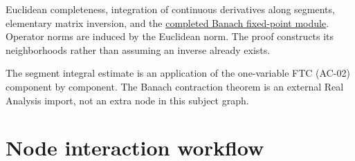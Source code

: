 \documentclass[preprint,12pt,aps,pra,showkeys,amsmath,amssymb,superscriptaddress,floatfix]{revtex4-2}
\theoremstyle{definition}
\theoremstyle{remark}
\begin{document}
Euclidean completeness, integration of continuous derivatives along
segments, elementary matrix inversion, and the
\href{../../../2-Analysis/Real-Analysis/projects/banach-fixed-point-theorem.md}{completed
Banach fixed-point module}. Operator norms are induced by the Euclidean
norm. The proof constructs its neighborhoods rather than assuming an
inverse already exists.

The segment integral estimate is an application of the one-variable FTC
(AC-02) component by component. The Banach contraction theorem is an
external Real Analysis import, not an extra node in this subject graph.

\clearpage\section{Node interaction workflow}
\end{document}

